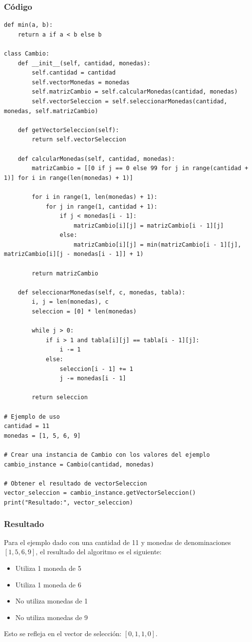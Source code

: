 \subsubsection{Código}
\begin{lstlisting}
def min(a, b):
    return a if a < b else b

class Cambio:
    def __init__(self, cantidad, monedas):
        self.cantidad = cantidad
        self.vectorMonedas = monedas
        self.matrizCambio = self.calcularMonedas(cantidad, monedas)
        self.vectorSeleccion = self.seleccionarMonedas(cantidad, monedas, self.matrizCambio)
    
    def getVectorSeleccion(self):
        return self.vectorSeleccion
    
    def calcularMonedas(self, cantidad, monedas):
        matrizCambio = [[0 if j == 0 else 99 for j in range(cantidad + 1)] for i in range(len(monedas) + 1)]
        
        for i in range(1, len(monedas) + 1):
            for j in range(1, cantidad + 1):
                if j < monedas[i - 1]:
                    matrizCambio[i][j] = matrizCambio[i - 1][j]
                else:
                    matrizCambio[i][j] = min(matrizCambio[i - 1][j], matrizCambio[i][j - monedas[i - 1]] + 1)
        
        return matrizCambio
    
    def seleccionarMonedas(self, c, monedas, tabla):
        i, j = len(monedas), c
        seleccion = [0] * len(monedas)
        
        while j > 0:
            if i > 1 and tabla[i][j] == tabla[i - 1][j]:
                i -= 1
            else:
                seleccion[i - 1] += 1
                j -= monedas[i - 1]
        
        return seleccion

# Ejemplo de uso
cantidad = 11
monedas = [1, 5, 6, 9]

# Crear una instancia de Cambio con los valores del ejemplo
cambio_instance = Cambio(cantidad, monedas)

# Obtener el resultado de vectorSeleccion
vector_seleccion = cambio_instance.getVectorSeleccion()
print("Resultado:", vector_seleccion)
\end{lstlisting}

\subsubsection{Resultado}
Para el ejemplo dado con una cantidad de 11 y monedas de denominaciones \([1, 5, 6, 9]\), el resultado del algoritmo es el siguiente:
\begin{itemize}
    \item Utiliza 1 moneda de 5
    \item Utiliza 1 moneda de 6
    \item No utiliza monedas de 1
    \item No utiliza monedas de 9
\end{itemize}
Esto se refleja en el vector de selección: \([0, 1, 1, 0]\).

